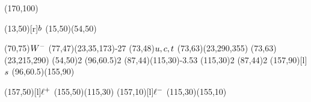 \documentclass{standalone}
\begin{document}
\begin{axopicture}(170,100)

  \Text(13,50)[r]{${b}$}                     %
  \Line[arrow](15,50)(54,50)                     %
                                                 
  \Text(70,75){\small{${W^-}$}}                    %
  \PhotonArc(77,47)(23,35,173){-2}{7}            %
  \Text(73,48){${u}, {c}, {t}$}      %
  \Arc[arrow,arrowpos=0.60](73,63)(23,290,355)   %
  \Arc[arrow,arrowpos=0.60](73,63)(23,215,290)   %
  \Vertex(54,50){2}                              %
  \Vertex(96,60.5){2}                            %
  \Gluon(87,44)(115,30){-3.5}{3}                 %
  \Vertex(115,30){2}                             %
  \Vertex(87,44){2}                              %
  \Text(157,90)[l]{${s}$}                    %
  \Line[arrow](96,60.5)(155,90)                  %
                                                 
  \Text(157,50)[l]{${\ell^+}$}                      %
  \Line[arrow](155,50)(115,30)                   %
  \Text(157,10)[l]{${\ell^-}$}                      %
  \Line[arrow](115,30)(155,10)                   %
                                                 
\end{axopicture}
\end{document}
